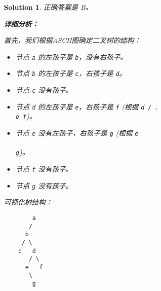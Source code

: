 \documentclass[UTF8]{report}
\newtheorem{solution}{Solution}
\theoremstyle{MyLineTheoremStyle} %
\theoremstyle{MyBlockTheoremStyle} %
\theoremstyle{MySubsubsectionStyle} %
\begin{document}
\begin{solution}
正确答案是 B。

\textbf{详细分析：}

首先，我们根据ASCII图确定二叉树的结构：
\begin{itemize}
    \item 节点 \texttt{a} 的左孩子是 \texttt{b}，没有右孩子。
    \item 节点 \texttt{b} 的左孩子是 \texttt{c}，右孩子是 \texttt{d}。
    \item 节点 \texttt{c} 没有孩子。
    \item 节点 \texttt{d} 的左孩子是 \texttt{e}，右孩子是 \texttt{f} (根据 \texttt{d / . \\ e   f})。
    \item 节点 \texttt{e} 没有左孩子，右孩子是 \texttt{g} (根据 \texttt{e \\ \\ g})。
    \item 节点 \texttt{f} 没有孩子。
    \item 节点 \texttt{g} 没有孩子。
\end{itemize}
可视化树结构：
\begin{verbatim}
        a
       /
      b
     / \
    c   d
       / \
      e   f
       \
        g
\end{verbatim}


\end{solution}
\end{document}
